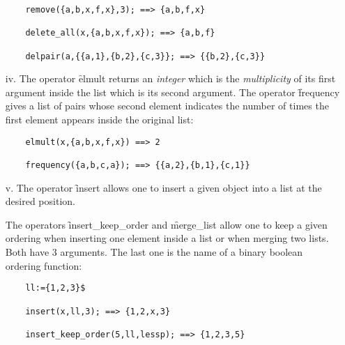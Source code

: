 \begin{itemize}
\begin{verbatim}
    remove({a,b,x,f,x},3); ==> {a,b,f,x}

    delete_all(x,{a,b,x,f,x}); ==> {a,b,f}

    delpair(a,{{a,1},{b,2},{c,3}}; ==> {{b,2},{c,3}}
\end{verbatim}
\item[iv.]
  \hypertarget{operator:ELMULT}{}
  \hypertarget{operator:FREQUENCY}{}
The operator \f{elmult} returns an \emph{integer} which is the
\emph{multiplicity} of its first argument inside the list which is its
second argument.
The operator \f{frequency} gives a list of pairs
whose second element indicates the number of times the first element
appears inside the original list:
\begin{verbatim}
    elmult(x,{a,b,x,f,x}) ==> 2

    frequency({a,b,c,a}); ==> {{a,2},{b,1},{c,1}}
\end{verbatim}
\item[v.]
  \hypertarget{operator:INSERT}{}
  \hypertarget{operator:INSERT_KEEP_ORDER}{}
  \hypertarget{operator:MERGE_LIST}{}
The operator \f{insert} allows one to insert a given object into a list
at the desired position.

The operators \f{insert\_keep\_order} and \f{merge\_list} allow one to
keep a given ordering when inserting one element inside a list or
when merging two lists. Both have 3 arguments. The last one  is
the name of a binary boolean ordering function:
\begin{verbatim}
    ll:={1,2,3}$

    insert(x,ll,3); ==> {1,2,x,3}

    insert_keep_order(5,ll,lessp); ==> {1,2,3,5}


\end{verbatim}
\end{itemize}

